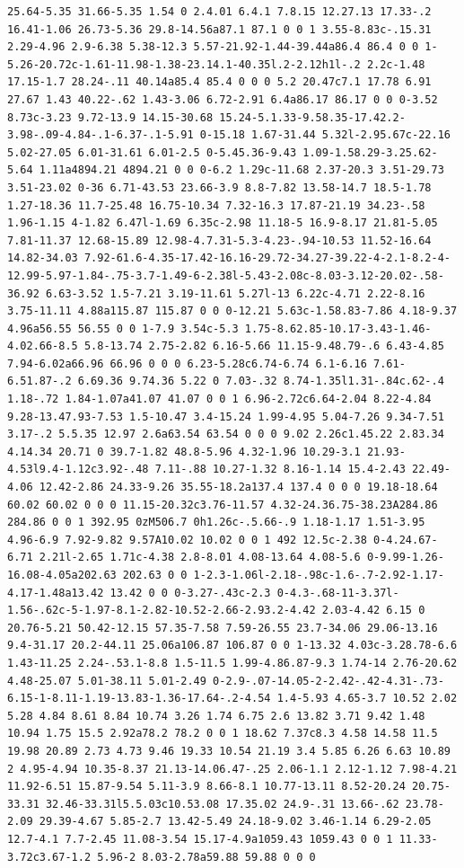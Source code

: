 \documentclass[11pt]{article}
\begin{document}
\begin{enumerate}
\begin{verbatim}
25.64-5.35 31.66-5.35 1.54 0 2.4.01 6.4.1 7.8.15 12.27.13 17.33-.2 16.41-1.06 26.73-5.36 29.8-14.56a87.1 87.1 0 0 1 3.55-8.83c-.15.31 2.29-4.96 2.9-6.38 5.38-12.3 5.57-21.92-1.44-39.44a86.4 86.4 0 0 1-5.26-20.72c-1.61-11.98-1.38-23.14.1-40.35l.2-2.12h1l-.2 2.2c-1.48 17.15-1.7 28.24-.11 40.14a85.4 85.4 0 0 0 5.2 20.47c7.1 17.78 6.91 27.67 1.43 40.22-.62 1.43-3.06 6.72-2.91 6.4a86.17 86.17 0 0 0-3.52 8.73c-3.23 9.72-13.9 14.15-30.68 15.24-5.1.33-9.58.35-17.42.2-3.98-.09-4.84-.1-6.37-.1-5.91 0-15.18 1.67-31.44 5.32l-2.95.67c-22.16 5.02-27.05 6.01-31.61 6.01-2.5 0-5.45.36-9.43 1.09-1.58.29-3.25.62-5.64 1.11a4894.21 4894.21 0 0 0-6.2 1.29c-11.68 2.37-20.3 3.51-29.73 3.51-23.02 0-36 6.71-43.53 23.66-3.9 8.8-7.82 13.58-14.7 18.5-1.78 1.27-18.36 11.7-25.48 16.75-10.34 7.32-16.3 17.87-21.19 34.23-.58 1.96-1.15 4-1.82 6.47l-1.69 6.35c-2.98 11.18-5 16.9-8.17 21.81-5.05 7.81-11.37 12.68-15.89 12.98-4.7.31-5.3-4.23-.94-10.53 11.52-16.64 14.82-34.03 7.92-61.6-4.35-17.42-16.16-29.72-34.27-39.22-4-2.1-8.2-4-12.99-5.97-1.84-.75-3.7-1.49-6-2.38l-5.43-2.08c-8.03-3.12-20.02-.58-36.92 6.63-3.52 1.5-7.21 3.19-11.61 5.27l-13 6.22c-4.71 2.22-8.16 3.75-11.11 4.88a115.87 115.87 0 0 0-12.21 5.63c-1.58.83-7.86 4.18-9.37 4.96a56.55 56.55 0 0 1-7.9 3.54c-5.3 1.75-8.62.85-10.17-3.43-1.46-4.02.66-8.5 5.8-13.74 2.75-2.82 6.16-5.66 11.15-9.48.79-.6 6.43-4.85 7.94-6.02a66.96 66.96 0 0 0 6.23-5.28c6.74-6.74 6.1-6.16 7.61-6.51.87-.2 6.69.36 9.74.36 5.22 0 7.03-.32 8.74-1.35l1.31-.84c.62-.4 1.18-.72 1.84-1.07a41.07 41.07 0 0 1 6.96-2.72c6.64-2.04 8.22-4.84 9.28-13.47.93-7.53 1.5-10.47 3.4-15.24 1.99-4.95 5.04-7.26 9.34-7.51 3.17-.2 5.5.35 12.97 2.6a63.54 63.54 0 0 0 9.02 2.26c1.45.22 2.83.34 4.14.34 20.71 0 39.7-1.82 48.8-5.96 4.32-1.96 10.29-3.1 21.93-4.53l9.4-1.12c3.92-.48 7.11-.88 10.27-1.32 8.16-1.14 15.4-2.43 22.49-4.06 12.42-2.86 24.33-9.26 35.55-18.2a137.4 137.4 0 0 0 19.18-18.64 60.02 60.02 0 0 0 11.15-20.32c3.76-11.57 4.32-24.36.75-38.23A284.86 284.86 0 0 1 392.95 0zM506.7 0h1.26c-.5.66-.9 1.18-1.17 1.51-3.95 4.96-6.9 7.92-9.82 9.57A10.02 10.02 0 0 1 492 12.5c-2.38 0-4.24.67-6.71 2.21l-2.65 1.71c-4.38 2.8-8.01 4.08-13.64 4.08-5.6 0-9.99-1.26-16.08-4.05a202.63 202.63 0 0 1-2.3-1.06l-2.18-.98c-1.6-.7-2.92-1.17-4.17-1.48a13.42 13.42 0 0 0-3.27-.43c-2.3 0-4.3-.68-11-3.37l-1.56-.62c-5-1.97-8.1-2.82-10.52-2.66-2.93.2-4.42 2.03-4.42 6.15 0 20.76-5.21 50.42-12.15 57.35-7.58 7.59-26.55 23.7-34.06 29.06-13.16 9.4-31.17 20.2-44.11 25.06a106.87 106.87 0 0 1-13.32 4.03c-3.28.78-6.6 1.43-11.25 2.24-.53.1-8.8 1.5-11.5 1.99-4.86.87-9.3 1.74-14 2.76-20.62 4.48-25.07 5.01-38.11 5.01-2.49 0-2.9-.07-14.05-2-2.42-.42-4.31-.73-6.15-1-8.11-1.19-13.83-1.36-17.64-.2-4.54 1.4-5.93 4.65-3.7 10.52 2.02 5.28 4.84 8.61 8.84 10.74 3.26 1.74 6.75 2.6 13.82 3.71 9.42 1.48 10.94 1.75 15.5 2.92a78.2 78.2 0 0 1 18.62 7.37c8.3 4.58 14.58 11.5 19.98 20.89 2.73 4.73 9.46 19.33 10.54 21.19 3.4 5.85 6.26 6.63 10.89 2 4.95-4.94 10.35-8.37 21.13-14.06.47-.25 2.06-1.1 2.12-1.12 7.98-4.21 11.92-6.51 15.87-9.54 5.11-3.9 8.66-8.1 10.77-13.11 8.52-20.24 20.75-33.31 32.46-33.31l5.5.03c10.53.08 17.35.02 24.9-.31 13.66-.62 23.78-2.09 29.39-4.67 5.85-2.7 13.42-5.49 24.18-9.02 3.46-1.14 6.29-2.05 12.7-4.1 7.7-2.45 11.08-3.54 15.17-4.9a1059.43 1059.43 0 0 1 11.33-3.72c3.67-1.2 5.96-2 8.03-2.78a59.88 59.88 0 0 0 
\end{verbatim}
\end{enumerate}
\end{document}
